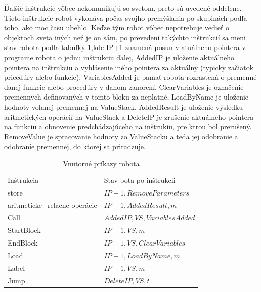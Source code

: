 Ďalšie inštrukcie vôbec nekomunikujú so svetom, preto sú uvedené oddelene. Tieto inštrukcie robot vykonáva počas svojho premýšľania po skupinách podľa toho, ako moc času ubehlo. Keďze tým robot vôbec nepotrebuje vedieť o objektoch sveta iných než je on sám, po prevedení takýchto inštrukcií sa meni stav robota podla tabuľky \ref{VnutroBota},kde IP+1 znamená posun v atuálneho pointera v programe robota o jednu inštrukciu ďalej, AddedIP je uloženie aktuálneho pointera na inštrukciu a vyhlásenie iného pointera za aktuálny (typicky začiatok pricedúry alebo funkcie), VariablesAdded je pamať robota rozrastená o premenné danej funkcie alebo procedúry v danom zanorení, ClearVariables je označenie premennych definovaných v tomto bloku za neplatné, LoadByName je uloženie hodnoty volanej premennej na ValueStack, AddedResult je uloženie výsledku aritmetických operácií na ValueStack a DeleteIP je zrušenie aktuálneho pointera na funkciu a obnovenie predchádzajúceho na inštrukiu, pre ktrou bol prerušený. RemoveValue je spracovanie hodnoty zo ValueStacku a teda jej odobranie a odobranie premennej, do ktorej sa priradzuje.

\begin{table}[ht]
\centering
\caption{Vnutorné príkazy robota}
\begin{tabular}{|l|p{5cm}|}
\hline\hline
Inštrukcia & Stav bota po inštrukcii \\
store & $ IP+1,RemoveParameters$\\
aritmeticke+relacne operácie & $IP+1,AddedResult,m$ \\
Call &  $ AddedIP,VS,VariablesAdded$\\
StartBlock & $IP+1,VS,m$\\
EndBlock & $IP+1,VS,ClearVariables$\\
Load & $ IP+1,LoadByName,m$\\
Label & $ IP+1,VS,m$\\
Jump & $ DeleteIP,VS,t$\\
\hline
\end{tabular}
\label{VnutroBota}
\end{table}
